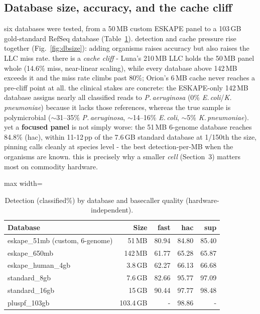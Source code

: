 \documentclass[10.5pt]{article}
\begin{document}
\subsection{Database size, accuracy, and the cache cliff}
six databases were tested, from a 50\,MB custom ESKAPE panel to a 103\,GB gold-standard RefSeq database (Table~\ref{tab:detection}). detection and cache pressure rise together (Fig.~\ref{fig:dbsize}): adding organisms raises accuracy but also raises the LLC miss rate. there is a \emph{cache cliff} - Luna's 210\,MB LLC holds the 50\,MB panel whole (14.6\% miss, near-linear scaling), while every database above 142\,MB exceeds it and the miss rate climbs past 80\%; Orion's 6\,MB cache never reaches a pre-cliff point at all. the clinical stakes are concrete: the ESKAPE-only 142\,MB database assigns nearly all classified reads to \textit{P.\,aeruginosa} (0\% \textit{E.\,coli}/\textit{K.\,pneumoniae}) because it lacks those references, whereas the true sample is polymicrobial ($\sim$31--35\% \textit{P.\,aeruginosa}, $\sim$14--16\% \textit{E.\,coli}, $\sim$5\% \textit{K.\,pneumoniae}). yet a \textbf{focused panel} is not simply worse: the 51\,MB 6-genome database reaches 84.8\% (hac), within 11-12\,pp of the 7.6\,GB standard database at 1/150th the size, pinning calls cleanly at species level - the best detection-per-MB when the organisms are known. this is precisely why a smaller \emph{cell} (Section~3) matters most on commodity hardware.

\begin{table}[h!]
\centering\footnotesize
\caption{Detection (classified\%) by database and basecaller quality (hardware-independent).}
\label{tab:detection}
\begin{adjustbox}{max width=\textwidth}
\begin{tabular}{@{}lrrrr@{}}
\toprule
\textbf{Database} & \textbf{Size} & \textbf{fast} & \textbf{hac} & \textbf{sup} \\
\midrule
eskape\_51mb (custom, 6-genome) & 51\,MB & 80.94 & 84.80 & 85.40 \\
eskape\_650mb & 142\,MB & 61.77 & 65.28 & 65.87 \\
eskape\_human\_4gb & 3.8\,GB & 62.27 & 66.13 & 66.68 \\
standard\_8gb & 7.6\,GB & 82.66 & 95.77 & 97.09 \\
standard\_16gb & 15\,GB & 90.44 & 97.77 & 98.48 \\
pluspf\_103gb & 103.4\,GB & - & 98.86 & - \\
\bottomrule
\end{tabular}
\end{adjustbox}
\end{table}
\end{document}
